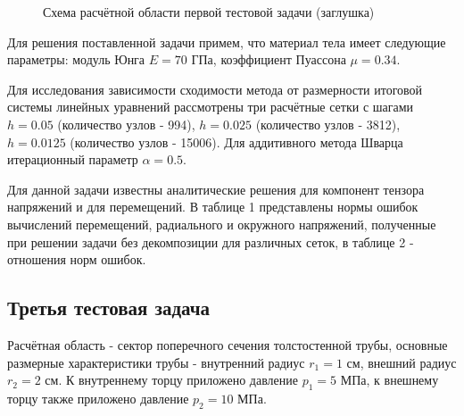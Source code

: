 \documentclass[a4paper]{article}
\begin{document}
\begin{figure}[h]
\caption{Схема расчётной области первой тестовой задачи (заглушка)}
\label{fig:task_01_scheme}
\end{figure}

Для решения поставленной задачи примем, что материал тела имеет следующие параметры: модуль Юнга $E = 70$ ГПа, коэффициент Пуассона $\mu = 0.34$. 

Для исследования зависимости сходимости метода от размерности итоговой системы линейных уравнений рассмотрены три расчётные сетки с шагами $h = 0.05$ (количество узлов - 994), $h = 0.025$ (количество узлов - 3812), $h = 0.0125$ (количество узлов - 15006). Для аддитивного метода Шварца итерационный параметр $\alpha = 0.5$.

Для данной задачи известны аналитические решения для компонент тензора напряжений и для перемещений. В таблице 1 представлены нормы ошибок вычислений перемещений, радиального и окружного напряжений, полученные при решении задачи без декомпозиции для различных сеток, в таблице 2 - отношения норм ошибок.

\newpage

\subsection{Третья тестовая задача}

Расчётная область - сектор поперечного сечения толстостенной трубы, основные размерные характеристики трубы - внутренний радиус $r_1 = 1$ см, внешний радиус $r_2 = 2$ см. К внутреннему торцу приложено давление $p_1 = 5$ МПа, к внешнему торцу также приложено давление $p_2 = 10$ МПа.
\end{document}
